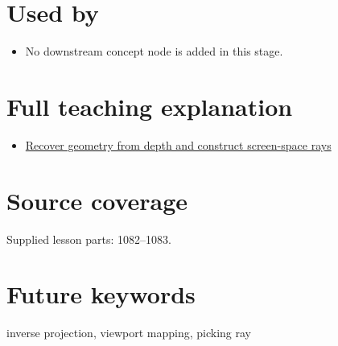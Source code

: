 \section{Used by}\label{appendix-f1a6d43e80d1-used-by}

\begin{itemize}
\tightlist
\item
  No downstream concept node is added in this stage.
\end{itemize}

\section{Full teaching explanation}\label{appendix-f1a6d43e80d1-full-teaching-explanation}

\begin{itemize}
\tightlist
\item
  \href{Continuous\%20Notes/Computing\%20Foundations\%20-\%20From\%20Bits\%20to\%20C++\%20and\%20Systems\%20APIs\#Recover\%20geometry\%20from\%20depth\%20and\%20construct\%20screen-space\%20rays}{Recover geometry from depth and construct screen-space rays}
\end{itemize}

\section{Source coverage}\label{appendix-f1a6d43e80d1-source-coverage}

Supplied lesson parts: 1082--1083.

\section{Future keywords}\label{appendix-f1a6d43e80d1-future-keywords}

inverse projection, viewport mapping, picking ray
